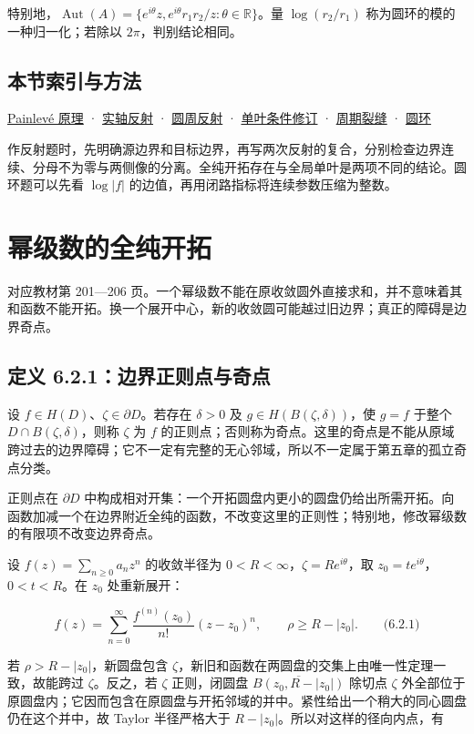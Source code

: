 \documentclass[11pt,a4paper]{article}
\begin{document}
特别地，\(\operatorname{Aut}(A)=\{e^{i\theta}z,e^{i\theta}r_1r_2/z:\theta\in\mathbb R\}\)。量
\(\log(r_2/r_1)\) 称为圆环的模的一种归一化；若除以
\(2\pi\)，判别结论相同。

\subsection{本节索引与方法}\label{ch06-s1-heading-7}

\hyperref[ch06-s1-heading-1]{Painlevé 原理} · \hyperref[ch06-s1-heading-2]{实轴反射} ·
\hyperref[ch06-s1-heading-3]{圆周反射} · \hyperref[ch06-s1-heading-4]{单叶条件修订} ·
\hyperref[ch06-s1-heading-5]{周期裂缝} · \hyperref[ch06-s1-heading-6]{圆环}

作反射题时，先明确源边界和目标边界，再写两次反射的复合，分别检查边界连续、分母不为零与两侧像的分离。全纯开拓存在与全局单叶是两项不同的结论。圆环题可以先看
\(\log|f|\) 的边值，再用闭路指标将连续参数压缩为整数。

\section{幂级数的全纯开拓}
对应教材第 201---206
页。一个幂级数不能在原收敛圆外直接求和，并不意味着其和函数不能开拓。换一个展开中心，新的收敛圆可能越过旧边界；真正的障碍是边界奇点。

\subsection{定义 6.2.1：边界正则点与奇点}\label{ch06-s2-heading-1}

设 \(f\in H(D)\)、\(\zeta\in\partial D\)。若存在 \(\delta>0\) 及
\(g\in H(B(\zeta,\delta))\)，使 \(g=f\) 于整个
\(D\cap B(\zeta,\delta)\)，则称 \(\zeta\) 为 \(f\)
的正则点；否则称为奇点。这里的奇点是不能从原域跨过去的边界障碍；它不一定有完整的无心邻域，所以不一定属于第五章的孤立奇点分类。

正则点在 \(\partial D\)
中构成相对开集：一个开拓圆盘内更小的圆盘仍给出所需开拓。向函数加减一个在边界附近全纯的函数，不改变这里的正则性；特别地，修改幂级数的有限项不改变边界奇点。

设 \(f(z)=\sum_{n\ge0}a_nz^n\) 的收敛半径为
\(0<R<\infty\)，\(\zeta=Re^{i\theta}\)，取
\(z_0=te^{i\theta}\)，\(0<t<R\)。在 \(z_0\) 处重新展开：

\[
f(z)=\sum_{n=0}^{\infty}\frac{f^{(n)}(z_0)}{n!}(z-z_0)^n,
\qquad\rho\ge R-|z_0|.\qquad\text{(6.2.1)}
\]

若 \(\rho>R-|z_0|\)，新圆盘包含
\(\zeta\)，新旧和函数在两圆盘的交集上由唯一性定理一致，故能跨过
\(\zeta\)。反之，若 \(\zeta\) 正则，闭圆盘 \(\overline{B(z_0,R-|z_0|)}\)
除切点 \(\zeta\)
外全部位于原圆盘内；它因而包含在原圆盘与开拓邻域的并中。紧性给出一个稍大的同心圆盘仍在这个并中，故
Taylor 半径严格大于 \(R-|z_0|\)。所以对这样的径向内点，有
\end{document}

